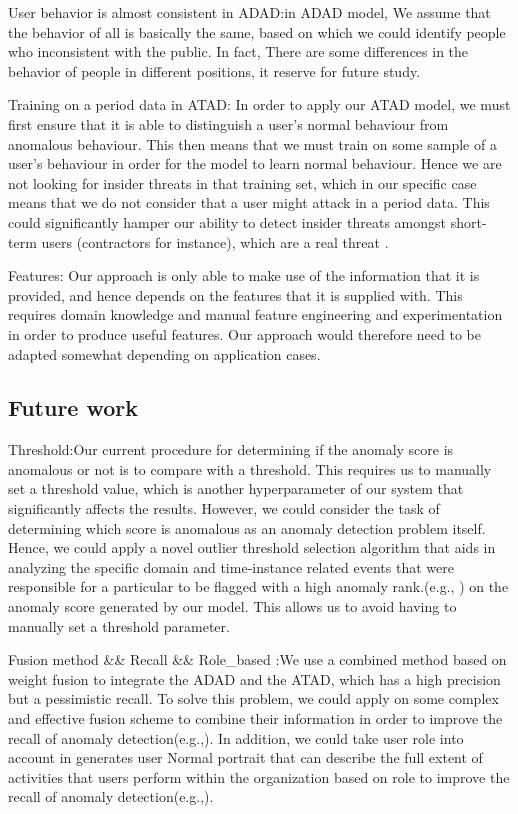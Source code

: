\documentclass[conference]{IEEEtran}
\begin{document}
User behavior is almost consistent in ADAD:in ADAD model, We assume that the behavior of all is basically the same, based on which we could identify people who inconsistent with the public. In fact, There are some differences in the behavior of people in different positions, it reserve for future study.

Training on a period data in ATAD: 
In order to apply our ATAD model, we must first ensure that it is able to distinguish a user’s normal behaviour from anomalous behaviour. This then means that we must train on some sample of a user’s behaviour in order for the model to learn normal behaviour. Hence we are not looking for insider threats in that training set, which in our specific case means that we do not consider that a user might attack in a period data. This could significantly hamper our ability to detect insider threats amongst short-term users (contractors for instance), which are a real threat \cite{b48}.

Features: Our approach is only able to make use of the information that it is provided, and hence depends on the features that it is supplied with. This requires domain knowledge and manual feature engineering and experimentation in order to produce useful features. Our approach would therefore need to be adapted somewhat depending on application cases.


\subsection{Future work} 
Threshold:Our current procedure for determining if the anomaly score is anomalous or not is to compare with a threshold. This requires us to manually set a threshold value, which is another hyperparameter of our system that significantly affects the results. However, we could consider the task of determining which score is anomalous as an anomaly detection problem itself. Hence, we could apply a novel outlier threshold selection algorithm that aids in analyzing the specific domain and time-instance related events that were responsible for a particular to be flagged with a high anomaly rank.(e.g., \cite{b49}) on the anomaly score generated by our model. This allows us to avoid having to manually set a threshold parameter.

Fusion method \&\& Recall \&\& Role\_based	:We use a combined method based on weight fusion to integrate the ADAD and the ATAD, which has a high precision but a pessimistic recall. To solve this problem, we could apply on some complex and effective fusion scheme to combine their information in order to improve the recall of anomaly detection(e.g.,\cite{b49}).  In addition, we could take user role into account in generates user Normal portrait that can describe the full extent of activities that users perform within the organization based on role to improve the recall of anomaly detection(e.g.,\cite{b50}).   	
\fi
\end{document}
